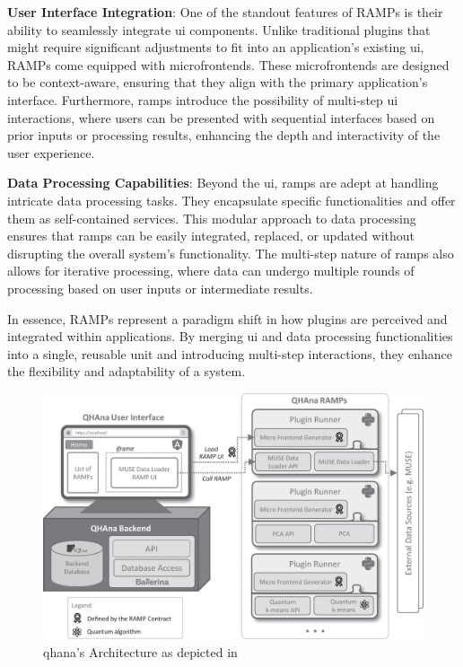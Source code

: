 \documentclass[
  a4paper,  %
  twoside,  %
  bibliography=totoc,
  headsepline,
  cleardoublepage=empty,
  parskip=half,
  draft=false
]{scrbook}
\begin{document}
\textbf{User Interface Integration}:
One of the standout features of RAMPs is their ability to seamlessly integrate \gls{ui} components.
Unlike traditional plugins that might require significant adjustments to fit into an application's existing \gls{ui}, RAMPs come equipped with microfrontends.
These microfrontends are designed to be context-aware, ensuring that they align with the primary application's interface.
Furthermore, \glspl{ramp} introduce the possibility of multi-step \gls{ui} interactions, where users can be presented with sequential interfaces based on prior inputs or processing results, enhancing the depth and interactivity of the user experience.

\textbf{Data Processing Capabilities}:
Beyond the \gls{ui}, \glspl{ramp} are adept at handling intricate data processing tasks.
They encapsulate specific functionalities and offer them as self-contained services.
This modular approach to data processing ensures that \glspl{ramp} can be easily integrated, replaced, or updated without disrupting the overall system's functionality.
The multi-step nature of \glspl{ramp} also allows for iterative processing, where data can undergo multiple rounds of processing based on user inputs or intermediate results.

In essence, RAMPs represent a paradigm shift in how plugins are perceived and integrated within applications.
By merging \gls{ui} and data processing functionalities into a single, reusable unit and introducing multi-step interactions, they enhance the flexibility and adaptability of a system.

\begin{figure}
  \centering
  \includegraphics[width=\textwidth]{graphics/qhanaarch.png}
  \caption{\gls{qhana}'s Architecture as depicted in \cite{Buehler2022}}
  \label{fig:qhanaarch}
\end{figure}
\end{document}
